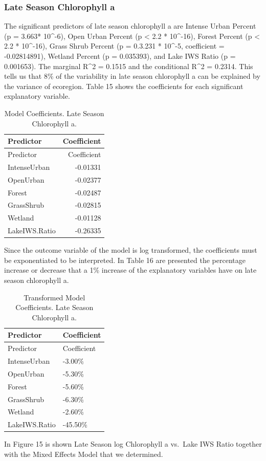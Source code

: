 \documentclass[12pt,]{article}
\begin{document}
\hypertarget{late-season-chlorophyll-a}{%
\subsubsection{Late Season Chlorophyll
a}\label{late-season-chlorophyll-a}}

The significant predictors of late season chlorophyll a are Intense
Urban Percent (p = 3.663* 10\^{}-6), Open Urban Percent (p \textless{}
2.2 * 10\^{}-16), Forest Percent (p \textless{} 2.2 * 10\^{}-16), Grass
Shrub Percent (p = 0.3.231 * 10\^{}-5, coefficient = -0.02814891),
Wetland Percent (p = 0.035393), and Lake IWS Ratio (p = 0.001653). The
marginal R\^{}2 = 0.1515 and the conditional R\^{}2 = 0.2314. This tells
us that 8\% of the variability in late season chlorophyll a can be
explained by the variance of ecoregion. Table 15 shows the coefficients
for each significant explanatory variable.

\begin{longtable}[]{@{}lr@{}}
\caption{Model Coefficients. Late Season Chlorophyll a.}\tabularnewline
\toprule
Predictor & Coefficient\tabularnewline
\midrule
\endfirsthead
\toprule
Predictor & Coefficient\tabularnewline
\midrule
\endhead
IntenseUrban & -0.01331\tabularnewline
OpenUrban & -0.02377\tabularnewline
Forest & -0.02487\tabularnewline
GrassShrub & -0.02815\tabularnewline
Wetland & -0.01128\tabularnewline
LakeIWS.Ratio & -0.26335\tabularnewline
\bottomrule
\end{longtable}

Since the outcome variable of the model is log transformed, the
coefficients must be exponentiated to be interpreted. In Table 16 are
presented the percentage increase or decrease that a 1\% increase of the
explanatory variables have on late season chlorophyll a.

\newpage

\begin{longtable}[]{@{}ll@{}}
\caption{Transformed Model Coefficients. Late Season Chlorophyll
a.}\tabularnewline
\toprule
Predictor & Coefficient\tabularnewline
\midrule
\endfirsthead
\toprule
Predictor & Coefficient\tabularnewline
\midrule
\endhead
IntenseUrban & -3.00\%\tabularnewline
OpenUrban & -5.30\%\tabularnewline
Forest & -5.60\%\tabularnewline
GrassShrub & -6.30\%\tabularnewline
Wetland & -2.60\%\tabularnewline
LakeIWS.Ratio & -45.50\%\tabularnewline
\bottomrule
\end{longtable}

In Figure 15 is shown Late Season log Chlorophyll a vs.~Lake IWS Ratio
together with the Mixed Effects Model that we determined.
\end{document}

